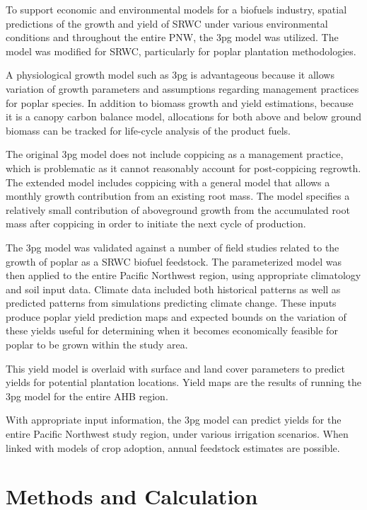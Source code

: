 \documentclass[preprint,12pt]{elsarticle}
\begin{document}
To support economic and environmental models for a biofuels industry,
spatial predictions of the growth and yield of \acf{SRWC} under
various environmental conditions and throughout the entire \acf{PNW},
the \acf{3pg} model was utilized.  The model was modified for
\ac{SRWC}, particularly for poplar plantation methodologies.

A physiological growth model such as \ac{3pg} is advantageous because
it allows variation of growth parameters and assumptions regarding
management practices for poplar species.  In addition to biomass growth
and yield estimations, because it is a canopy carbon balance model,
allocations for both above and below ground biomass can be tracked for
life-cycle analysis of the product fuels.

The original \ac{3pg} model does not include coppicing as a management
practice, which is problematic as it cannot reasonably account for
post-coppicing regrowth.  The extended model includes coppicing with a
general model that allows a monthly growth contribution from an
existing root mass.  The model specifies a relatively small
contribution of aboveground growth from the accumulated root mass
after coppicing in order to initiate the next cycle of production.

The \ac{3pg} model was validated against a number of field studies
related to the growth of poplar as a \ac{SRWC} biofuel feedstock.  The
parameterized model was then applied to the entire Pacific Northwest
region, using appropriate climatology and soil input data.  Climate
data included both historical patterns as well as predicted patterns
from simulations predicting climate change.  These inputs produce
poplar yield prediction maps and expected bounds on the variation of
these yields useful for determining when it becomes economically
feasible for poplar to be grown within the study area. 

This yield model is overlaid with surface and land cover
parameters to predict yields for potential plantation locations.
Yield maps are the results of running the \ac{3pg} model for the
entire \ac{AHB} region. 

With appropriate input information, the \ac{3pg} model can predict
yields for the entire Pacific Northwest study region, under various
irrigation scenarios.  When linked with models of crop adoption,
annual feedstock estimates are possible.

\section{Methods and Calculation}
\end{document}
